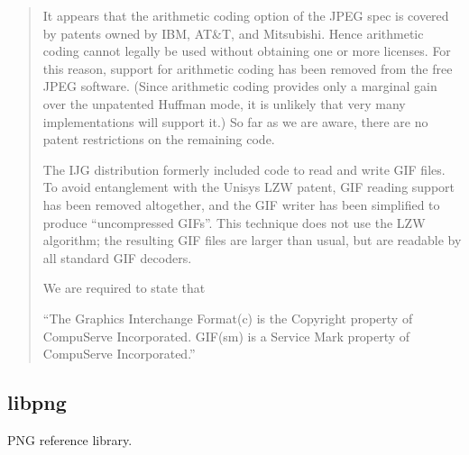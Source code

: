 \documentclass[
]{book}
\theoremstyle{definition}
\theoremstyle{definition}
\theoremstyle{definition}
\theoremstyle{definition}
\theoremstyle{remark}
\begin{document}
\begin{quote}
It appears that the arithmetic coding option of the JPEG spec is covered by
patents owned by IBM, AT\&T, and Mitsubishi. Hence arithmetic coding cannot
legally be used without obtaining one or more licenses. For this reason,
support for arithmetic coding has been removed from the free JPEG software.
(Since arithmetic coding provides only a marginal gain over the unpatented
Huffman mode, it is unlikely that very many implementations will support it.)
So far as we are aware, there are no patent restrictions on the remaining
code.

The IJG distribution formerly included code to read and write GIF files.
To avoid entanglement with the Unisys LZW patent, GIF reading support has
been removed altogether, and the GIF writer has been simplified to produce
``uncompressed GIFs''. This technique does not use the LZW algorithm; the
resulting GIF files are larger than usual, but are readable by all standard
GIF decoders.

We are required to state that

``The Graphics Interchange Format(c) is the Copyright property of
CompuServe Incorporated. GIF(sm) is a Service Mark property of
CompuServe Incorporated.''
\end{quote}

\hypertarget{libpng}{%
\subsection*{libpng}\label{libpng}}

PNG reference library.
\end{document}
